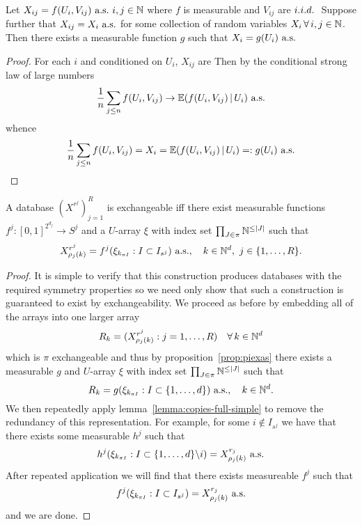 \begin{lemma}
  \label{lemma:copies-full-simple}
  Let $X_{ij} = f({U}_i, {V}_{ij}) \ \textrm{a.s.} \ i,j \in \mathbb{N}$ where $f$ is measurable and ${V}_{ij}$ are $i.i.d.\ $
  Suppose further that $X_{ij} = X_i \ \textrm{a.s.}$ for some collection of random variables $X_{i} \, \forall \, i,j \in \mathbb{N}$.
  Then there exists a measurable function $g$ such that $X_i = g({U}_i) \ \textrm{a.s.}$
\end{lemma}

\begin{proof}
  For each $i$ and conditioned on $U_i$, ${X}_{ij}$ are \iid
  Then by the conditional strong law of large numbers
  \[
    \frac{1}{n}\sum_{j \leq n} f(U_i, V_{ij}) \to \mathbb{E}(f(U_i, V_{ij})\,|\, U_i) \,\, \textrm{a.s.}
  \]
  whence
  \[
    \frac{1}{n}\sum_{j \leq n} f(U_i, V_{ij}) = X_i = \mathbb{E}(f(U_i, V_{ij})\,|\, U_i) =: g(U_i) \,\, \textrm{a.s.}
  \]
\end{proof}

\begin{thm}
  \label{thm:as-database}
  A database $(X^{r^j})_{j=1}^R$ is exchangeable iff there exist measurable functions $f^j : [0,1]^{2^{d_j}} \to S^j$ and a $U$-array $\xi$ with index set $\prod_{J\in\pi} \mathbb{N}^{\leq |J|}$ such that
  \begin{equation}
    X_{\rho_j(k)}^{r^j} = f^j(\xi_{k_{\pi I}} : I \subset I_{s^j}) \ \as, \quad k \in \Nats^d, \ j \in \{1,\ldots,R\}.
  \end{equation}
\end{thm}

\begin{proof}
  It is simple to verify that this construction produces databases with the required symmetry properties so we need only show that such a construction is guaranteed to exist by exchangeability.
  We proceed as before by embedding all of the arrays into one larger array
  \[
    R_{k} = (X^{r^j}_{\rho_j(k)} : j = 1,\dots,R) \quad \forall \, k \in \mathbb{N}^d
  \]
  which is $\pi$ exchangeable and thus by proposition~\ref{prop:piexas} there exists a measurable $g$ and $U$-array $\xi$ with index set $\prod_{J\in\pi} \mathbb{N}^{\leq |J|}$ such that
  \[
    R_{k} = g(\xi_{k_{\pi I}} : I \subset \{1,\ldots,d\}) \ \textrm{a.s.}, \quad k \in \mathbb{N}^d.
  \]
  We then repeatedly apply lemma~\ref{lemma:copies-full-simple} to remove the redundancy of this representation.
  For example, for some $i \notin I_{s^j}$ we have that there exists some measurable $h^j$ such that
  \[
    h^j(\xi_{k_{\pi I}} : I \subset \{1,\ldots,d\} \backslash i) = X^{r_j}_{\rho_j(k)} \ \textrm{a.s.}
  \]
  After repeated application we will find that there exists measureable $f^j$ such that
  \[
    f^j(\xi_{k_{\pi I}} : I \subset I_{s^j}) = X^{r_j}_{\rho_j(k)} \ \textrm{a.s.}
  \]
  and we are done.
\end{proof}

